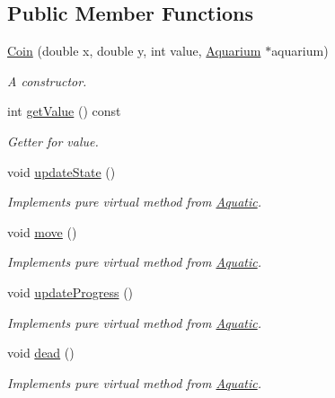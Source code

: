 \subsection*{Public Member Functions}
\begin{DoxyCompactItemize}
\item 
\mbox{\hyperlink{class_coin_a60b7cf94d6893b82e2b450580f555e83}{Coin}} (double x, double y, int value, \mbox{\hyperlink{class_aquarium}{Aquarium}} $\ast$aquarium)
\begin{DoxyCompactList}\small\item\em A constructor. \end{DoxyCompactList}\item 
int \mbox{\hyperlink{class_coin_a53c8bf65afdde1422cfda51d753d74b7}{get\+Value}} () const
\begin{DoxyCompactList}\small\item\em Getter for value. \end{DoxyCompactList}\item 
void \mbox{\hyperlink{class_coin_ac9d03cbd68f9ccb739895832f77d60a3}{update\+State}} ()
\begin{DoxyCompactList}\small\item\em Implements pure virtual method from \mbox{\hyperlink{class_aquatic}{Aquatic}}. \end{DoxyCompactList}\item 
void \mbox{\hyperlink{class_coin_ab62bca5834489b9b483deaa3ca3470e9}{move}} ()
\begin{DoxyCompactList}\small\item\em Implements pure virtual method from \mbox{\hyperlink{class_aquatic}{Aquatic}}. \end{DoxyCompactList}\item 
void \mbox{\hyperlink{class_coin_ac54d7b690f7e415d2220711f718f638e}{update\+Progress}} ()
\begin{DoxyCompactList}\small\item\em Implements pure virtual method from \mbox{\hyperlink{class_aquatic}{Aquatic}}. \end{DoxyCompactList}\item 
void \mbox{\hyperlink{class_coin_af0c650f68a63698691c574fbef940776}{dead}} ()
\begin{DoxyCompactList}\small\item\em Implements pure virtual method from \mbox{\hyperlink{class_aquatic}{Aquatic}}. \end{DoxyCompactList}\end{DoxyCompactItemize}


